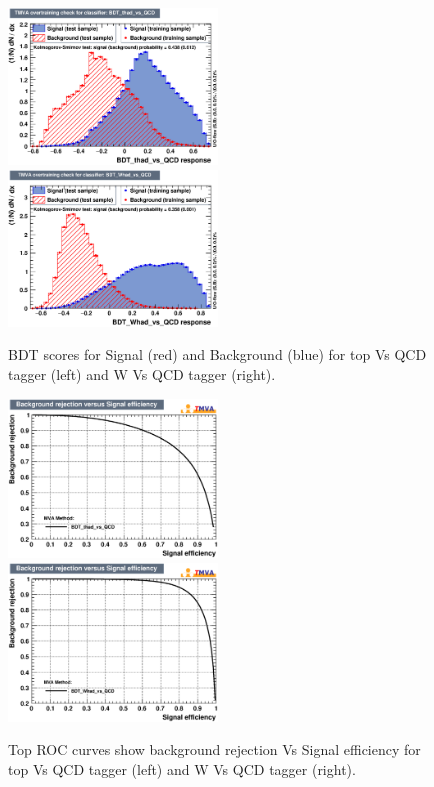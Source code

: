 \begin{figure}[!htb]\centering
\includegraphics[width=0.495\textwidth]{Fig/TMVA/thad_vs_QCD/overtrain_BDT_thad_vs_QCD.eps}
\includegraphics[width=0.495\textwidth]{Fig/TMVA/Whad_vs_QCD/overtrain_BDT_Whad_vs_QCD.eps}
\caption{BDT scores for Signal (red) and Background (blue) for top Vs QCD tagger (left) and W Vs QCD tagger (right).}
\label{fig:TMVA_BDTscore}
\end{figure}

\begin{figure}[!htb]\centering
\includegraphics[width=0.495\textwidth]{Fig/TMVA/thad_vs_QCD/rejBvsS.eps}
\includegraphics[width=0.495\textwidth]{Fig/TMVA/Whad_vs_QCD/rejBvsS.eps}
\caption{Top ROC curves show background rejection Vs Signal efficiency for top Vs QCD tagger (left) and W Vs QCD tagger (right).}
\label{fig:TMVA_ROC}
\end{figure}

